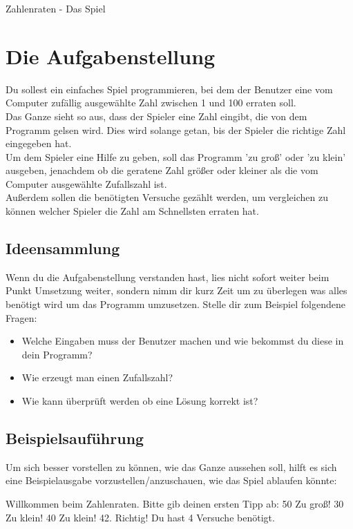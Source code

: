 \documentclass{\VorlagenPfad/coderdojokatext}
\newcommand{\Titel}{Zahlenraten - Das Spiel}
\begin{document}
\setcounter{chapter}{1}

\begin{center}
	{\huge \Titel}
\end{center}

\section{Die Aufgabenstellung} Du sollest ein einfaches Spiel programmieren, bei dem der Benutzer eine vom Computer zufällig ausgewählte Zahl zwischen 1 und 100 erraten soll.
\\Das Ganze sieht so aus, dass der Spieler eine Zahl eingibt, die von dem Programm gelsen wird. Dies wird solange getan, bis der Spieler die richtige Zahl eingegeben hat.
\\
Um dem Spieler eine Hilfe zu geben, soll das Programm 'zu groß' oder 'zu klein' ausgeben, jenachdem ob die geratene Zahl größer oder kleiner als die vom Computer ausgewählte Zufallszahl ist.
\\Außerdem sollen die benötigten Versuche gezählt werden, um vergleichen zu können welcher Spieler die Zahl am Schnellsten erraten hat.

\subsection{Ideensammlung} Wenn du die Aufgabenstellung verstanden hast, lies nicht sofort weiter beim Punkt Umsetzung weiter, sondern nimm dir kurz Zeit um zu überlegen was alles benötigt wird um das Programm umzusetzen. Stelle dir zum Beispiel folgendene Fragen:
\begin{itemize}
	\item Welche Eingaben muss der Benutzer machen und wie bekommst du diese in dein Programm?
	\item Wie erzeugt man einen Zufallszahl?
	\item Wie kann überprüft werden ob eine Lösung korrekt ist?
\end{itemize}

\subsection{Beispielsauführung} Um sich besser vorstellen zu können, wie das Ganze aussehen soll, hilft es sich eine Beispielausgabe vorzustellen/anzuschauen, wie das Spiel ablaufen könnte:

\begin{pseudocode}
Willkommen beim Zahlenraten. Bitte gib deinen ersten Tipp ab:
50
Zu groß!
30
Zu klein!
40
Zu klein!
42.
Richtig! Du hast 4 Versuche benötigt.
\end{pseudocode}
\end{document}
